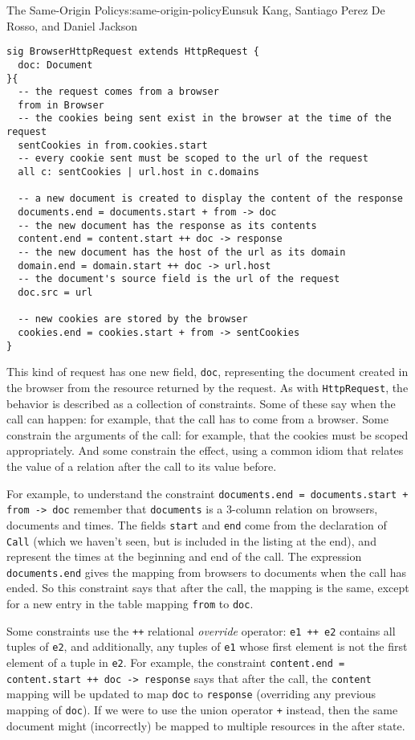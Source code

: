 \begin{aosachapter}{The Same-Origin Policy}{s:same-origin-policy}{Eunsuk Kang, Santiago Perez De Rosso, and Daniel Jackson}
\begin{verbatim}
sig BrowserHttpRequest extends HttpRequest {
  doc: Document
}{
  -- the request comes from a browser
  from in Browser
  -- the cookies being sent exist in the browser at the time of the request
  sentCookies in from.cookies.start
  -- every cookie sent must be scoped to the url of the request
  all c: sentCookies | url.host in c.domains

  -- a new document is created to display the content of the response
  documents.end = documents.start + from -> doc
  -- the new document has the response as its contents
  content.end = content.start ++ doc -> response
  -- the new document has the host of the url as its domain
  domain.end = domain.start ++ doc -> url.host
  -- the document's source field is the url of the request
  doc.src = url

  -- new cookies are stored by the browser
  cookies.end = cookies.start + from -> sentCookies
}
\end{verbatim}

This kind of request has one new field, \texttt{doc}, representing the
document created in the browser from the resource returned by the
request. As with \texttt{HttpRequest}, the behavior is described as a
collection of constraints. Some of these say when the call can happen:
for example, that the call has to come from a browser. Some constrain
the arguments of the call: for example, that the cookies must be scoped
appropriately. And some constrain the effect, using a common idiom that
relates the value of a relation after the call to its value before.

For example, to understand the constraint
\texttt{documents.end = documents.start + from -\textgreater{} doc}
remember that \texttt{documents} is a 3-column relation on browsers,
documents and times. The fields \texttt{start} and \texttt{end} come
from the declaration of \texttt{Call} (which we haven't seen, but is
included in the listing at the end), and represent the times at the
beginning and end of the call. The expression \texttt{documents.end}
gives the mapping from browsers to documents when the call has ended. So
this constraint says that after the call, the mapping is the same,
except for a new entry in the table mapping \texttt{from} to
\texttt{doc}.

Some constraints use the \texttt{++} relational \emph{override}
operator: \texttt{e1 ++ e2} contains all tuples of \texttt{e2}, and
additionally, any tuples of \texttt{e1} whose first element is not the
first element of a tuple in \texttt{e2}. For example, the constraint
\texttt{content.end = content.start ++ doc -\textgreater{} response}
says that after the call, the \texttt{content} mapping will be updated
to map \texttt{doc} to \texttt{response} (overriding any previous
mapping of \texttt{doc}). If we were to use the union operator
\texttt{+} instead, then the same document might (incorrectly) be mapped
to multiple resources in the after state.


\end{aosachapter}
